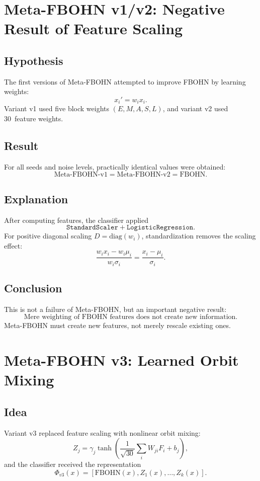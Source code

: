 \documentclass[11pt,a4paper]{report}
\begin{document}
\section{Meta-FBOHN v1/v2: Negative Result of Feature Scaling}
\label{sec:meta_fbohn_v1v2}

\subsection{Hypothesis}
The first versions of Meta-FBOHN attempted to improve FBOHN by learning weights:
\[
x_i' = w_i x_i.
\]
Variant v1 used five block weights $(E,M,A,S,L)$, and variant v2 used 30~feature weights.

\subsection{Result}
For all seeds and noise levels, practically identical values were obtained:
\[
\text{Meta-FBOHN-v1}=\text{Meta-FBOHN-v2}=\text{FBOHN}.
\]

\subsection{Explanation}
After computing features, the classifier applied
\[
\texttt{StandardScaler}+\texttt{LogisticRegression}.
\]
For positive diagonal scaling $D=\mathrm{diag}(w_i)$, standardization removes the scaling effect:
\[
\frac{w_ix_i-w_i\mu_i}{w_i\sigma_i}=\frac{x_i-\mu_i}{\sigma_i}.
\]

\subsection{Conclusion}
This is not a failure of Meta-FBOHN, but an important negative result:
\[
\boxed{\text{Mere weighting of FBOHN features does not create new information.}}
\]
Meta-FBOHN must create new features, not merely rescale existing ones.

\section{Meta-FBOHN v3: Learned Orbit Mixing}
\label{sec:meta_fbohn_v3}

\subsection{Idea}
Variant v3 replaced feature scaling with nonlinear orbit mixing:
\[
Z_j=\gamma_j\tanh\!\left(\frac{1}{\sqrt{30}}\sum_i W_{ji}F_i+b_j\right),
\]
and the classifier received the representation
\[
\Phi_{v3}(x)=[\text{FBOHN}(x),Z_1(x),\ldots,Z_k(x)].
\]
\end{document}
